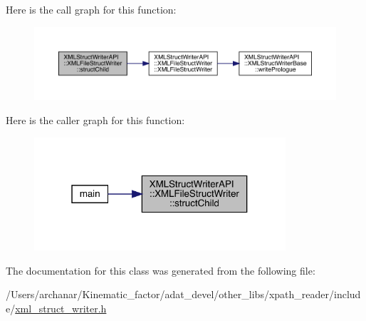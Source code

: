 Here is the call graph for this function\+:
\nopagebreak
\begin{figure}[H]
\begin{center}
\leavevmode
\includegraphics[width=350pt]{db/de3/classXMLStructWriterAPI_1_1XMLFileStructWriter_a29ff0f4353991294bab0c75ab8895f73_cgraph}
\end{center}
\end{figure}
Here is the caller graph for this function\+:\nopagebreak
\begin{figure}[H]
\begin{center}
\leavevmode
\includegraphics[width=265pt]{db/de3/classXMLStructWriterAPI_1_1XMLFileStructWriter_a29ff0f4353991294bab0c75ab8895f73_icgraph}
\end{center}
\end{figure}


The documentation for this class was generated from the following file\+:\begin{DoxyCompactItemize}
\item 
/\+Users/archanar/\+Kinematic\+\_\+factor/adat\+\_\+devel/other\+\_\+libs/xpath\+\_\+reader/include/\mbox{\hyperlink{other__libs_2xpath__reader_2include_2xml__struct__writer_8h}{xml\+\_\+struct\+\_\+writer.\+h}}\end{DoxyCompactItemize}
